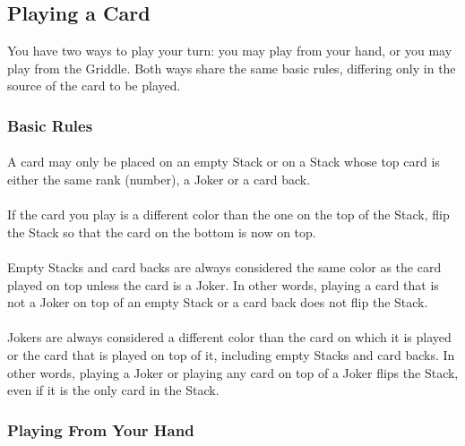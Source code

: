 \documentclass{article}
\begin{document}
\subsection{Playing a Card}
\label{sec:playcard}

You have two ways to play your turn: you may play from your hand, or you may play from the Griddle. Both ways share the same basic rules, differing only in the source of the card to be played.

\subsubsection{Basic Rules}
\label{sec:legalplays}

\paragraph{}
A card may only be placed on an empty Stack or on a Stack whose top card is either the same rank (number), a Joker or a card back.

\paragraph{}
If the card you play is a different color than the one on the top of the Stack, flip the Stack so that the card on the bottom is now on top.

\paragraph{}
Empty Stacks and card backs are always considered the same color as the card played on top unless the card is a Joker.
In other words, playing a card that is not a Joker on top of an empty Stack or a card back does not flip the Stack.

\paragraph{}
Jokers are always considered a different color than the card on which it is played or the card that is played on top of it, including empty Stacks and card backs.
In other words, playing a Joker or playing any card on top of a Joker flips the Stack, even if it is the only card in the Stack.

\subsubsection{Playing From Your Hand}
\label{sec:fromhand}
\end{document}
